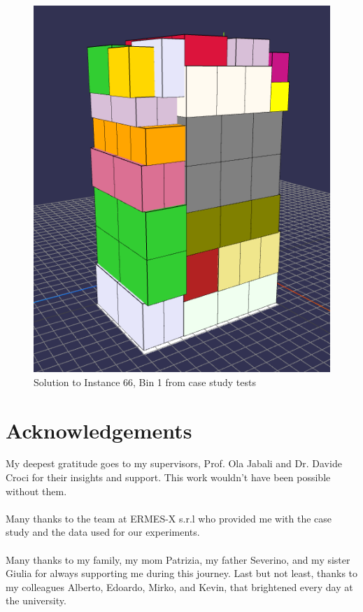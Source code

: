 \documentclass[11pt,a4paper,twocolumn]{article}
\begin{document}
\begin{figure}
    \centering
    \includegraphics[width = \columnwidth]{tests/usecase/instance-66_bin1_k200.PNG}
    \caption{Solution to Instance 66, Bin 1 from case study tests}
\end{figure}

\section{Acknowledgements}
My deepest gratitude goes to my supervisors, Prof. Ola Jabali and Dr. Davide Croci for their insights and support.
This work wouldn't have been possible without them.\\
\\
Many thanks to the team at ERMES-X s.r.l who provided me with the case study and the data used for our experiments.\\
\\
Many thanks to my family, my mom Patrizia, my father Severino, and my sister Giulia for always supporting me during this journey.
Last but not least, thanks to my colleagues Alberto, Edoardo, Mirko, and Kevin, that brightened every day at the university.

\end{document}
